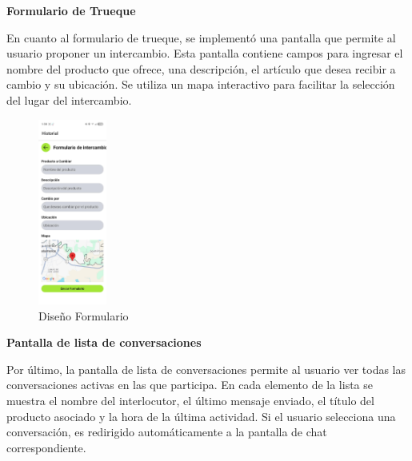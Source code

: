 \documentclass[11pt, a4paper, oneside]{book}
\begin{document}
 \textbf{Formulario de Trueque}

En cuanto al formulario de trueque, se implementó una pantalla que permite al usuario proponer un intercambio.
Esta pantalla contiene campos para ingresar el nombre del producto que ofrece, una descripción, el artículo 
que desea recibir a cambio y su ubicación. Se utiliza un mapa interactivo para facilitar la selección del 
lugar del intercambio. 

 \begin{figure}[H]
 \centering
 \includegraphics[width=0.2\textwidth]{Pictures/4.png}
 \caption{Diseño Formulario}
  \end{figure}

  

\textbf{Pantalla de lista de conversaciones}

Por último, la pantalla de lista de conversaciones permite al usuario ver todas las conversaciones activas en las que participa. En cada elemento de la lista se muestra el nombre del interlocutor, el último mensaje enviado, el título del producto asociado y la hora de la última actividad. Si el usuario selecciona una conversación, es redirigido automáticamente a la pantalla de chat correspondiente.


     
\end{document}
